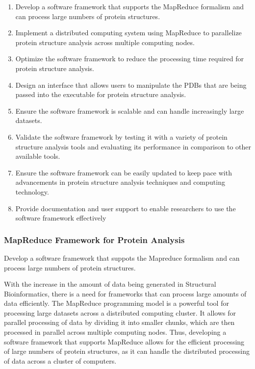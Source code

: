\documentclass[]{final_report}
\begin{document}
\begin{enumerate}
    \item Develop a software framework that supports the MapReduce formalism and can process large numbers of protein structures.
    \item Implement a distributed computing system using MapReduce to parallelize protein structure analysis across multiple computing nodes.
    \item Optimize the software framework to reduce the processing time required for protein structure analysis.
    \item Design an interface that allows users to manipulate the PDBs that are being passed into the executable for protein structure analysis.
    \item Ensure the software framework is scalable and can handle increasingly large datasets.
    \item Validate the software framework by testing it with a variety of protein structure analysis tools and evaluating its performance in comparison to other available tools.
    \item Ensure the software framework can be easily updated to keep pace with advancements in protein structure analysis techniques and computing technology.
    \item Provide documentation and user support to enable researchers to use the software framework effectively
\end{enumerate}
\clearpage

\subsubsection{MapReduce Framework for Protein Analysis}

\begin{displayquote}
    Develop a software framework that suppots the Mapreduce formalism and can process large numbers of protein structures.
\end{displayquote}

With the increase in the amount of data being generated in Structural Bioinformatics, there is a need for frameworks that can process large amounts of data efficiently. The MapReduce programming model is a powerful tool for processing large datasets across a distributed computing cluster. It allows for parallel processing of data by dividing it into smaller chunks, which are then processed in parallel across multiple computing nodes. Thus, developing a software framework that supports MapReduce allows for the efficient processing of large numbers of protein structures, as it can handle the distributed processing of data across a cluster of computers.
\end{document}
